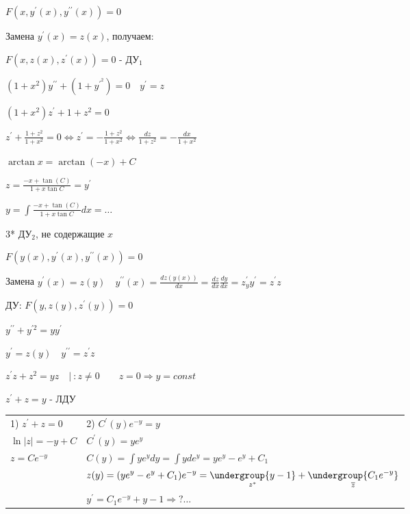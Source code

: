 \documentclass[12pt]{article}
\begin{document}
    $\displaystyle F(x, y^\prime(x), y^{\prime\prime}(x)) = 0$

    Замена $\displaystyle y^\prime(x) = z(x)$, получаем:

    $\displaystyle F(x, z(x), z^\prime(x)) = 0$ - ДУ$\displaystyle _1$

    \Ex $\displaystyle (1 + x^2)y^{\prime\prime} + (1 + y^\prime^2) = 0 \quad y^\prime = z$

    $\displaystyle (1 + x^2)z^\prime + 1 + z^2 = 0$

    $\displaystyle z^\prime + \frac{1 + z^2}{1 + x^2} = 0 \Longleftrightarrow z^\prime = -\frac{1 + z^2}{1 + x^2} \Longleftrightarrow \frac{dz}{1 + z^2} = -\frac{dx}{1 + x^2}$

    $\arctan x = \arctan(-x) + C$

    $\displaystyle z = \frac{-x + \tan(C)}{1 + x \tan C} = y^\prime$

    $\displaystyle y = \int \frac{-x + \tan(C)}{1 + x \tan C} dx = \dots $

    3* ДУ$\displaystyle _2$, не содержащие $x$

    $\displaystyle F(y(x), y^\prime(x), y^{\prime\prime}(x)) = 0$

    Замена $\displaystyle y^\prime(x) = z(y) \quad y^{\prime\prime}(x) = \frac{dz(y(x))}{dx} = \frac{dz}{dx} \frac{dy}{dx} = z^\prime_y y^\prime = z^\prime z$

    ДУ: $\displaystyle F(y, z(y), z^\prime(y)) = 0$

    \Ex $\displaystyle y^{\prime\prime} + y^{\prime 2} = yy^\prime$

    $\displaystyle y^\prime = z(y) \quad y^{\prime\prime} = z^\prime z$

    $\displaystyle z^\prime z + z^2 = yz \quad | \ : z \neq 0 \quad\quad z = 0 \Longrightarrow y = const$

    $\displaystyle z^\prime + z = y$ - ЛДУ

    \begin{tabular}{p{5cm}p{10cm}}
        1) $\displaystyle z^\prime + z = 0$ & 2) $\displaystyle C^\prime (y) e^{-y} = y$                                                                                              \\

        $\ln|z| = -y + C$     & $\displaystyle C^\prime (y) = ye^{y}$                                                                                                   \\

        $\displaystyle z = Ce^{-y}$         & $\displaystyle C(y) = \int y e^y dy = \int y de^y = ye^y - e^y + C_1$                                                                   \\

        & $\displaystyle z(y) = (ye^y - e^y + C_1)e^{-y} = \underset{z^*}{\undergroup{y - 1}} + \underset{\overline{z}}{\undergroup{C_1 e^{-y}}}$ \\

        & $\displaystyle y^\prime = C_1 e^{-y} + y - 1 \Longrightarrow ? \dots $

    \end{tabular}
\end{document}
